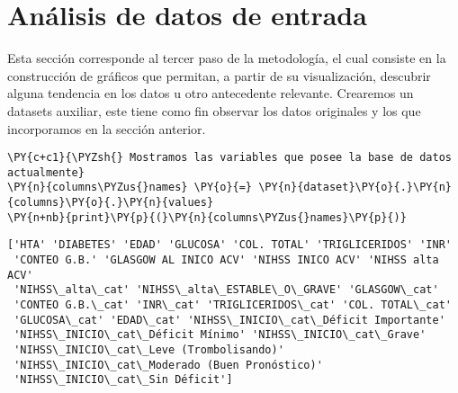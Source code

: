     \hypertarget{anuxe1lisis-de-datos-de-entrada}{%
\section{Análisis de datos de entrada}\label{anuxe1lisis-de-datos-de-entrada}}

Esta sección corresponde al tercer paso de la metodología, el cual consiste en la construcción de gráficos que permitan, a partir de su visualización, descubrir alguna tendencia en los datos u otro antecedente relevante. Crearemos un datasets auxiliar, este tiene como fin observar los datos originales y los que incorporamos en la sección anterior.

    \begin{tcolorbox}[breakable, size=fbox, boxrule=1pt, pad at break*=1mm,colback=cellbackground, colframe=cellborder]
\begin{Verbatim}[commandchars=\\\{\}]
\PY{c+c1}{\PYZsh{} Mostramos las variables que posee la base de datos actualmente}
\PY{n}{columns\PYZus{}names} \PY{o}{=} \PY{n}{dataset}\PY{o}{.}\PY{n}{columns}\PY{o}{.}\PY{n}{values}
\PY{n+nb}{print}\PY{p}{(}\PY{n}{columns\PYZus{}names}\PY{p}{)}
\end{Verbatim}
\end{tcolorbox}

    \begin{Verbatim}[commandchars=\\\{\}]
['HTA' 'DIABETES' 'EDAD' 'GLUCOSA' 'COL. TOTAL' 'TRIGLICERIDOS' 'INR'
 'CONTEO G.B.' 'GLASGOW AL INICO ACV' 'NIHSS INICO ACV' 'NIHSS alta ACV'
 'NIHSS\_alta\_cat' 'NIHSS\_alta\_ESTABLE\_O\_GRAVE' 'GLASGOW\_cat'
 'CONTEO G.B.\_cat' 'INR\_cat' 'TRIGLICERIDOS\_cat' 'COL. TOTAL\_cat'
 'GLUCOSA\_cat' 'EDAD\_cat' 'NIHSS\_INICIO\_cat\_Déficit Importante'
 'NIHSS\_INICIO\_cat\_Déficit Mínimo' 'NIHSS\_INICIO\_cat\_Grave'
 'NIHSS\_INICIO\_cat\_Leve (Trombolisando)'
 'NIHSS\_INICIO\_cat\_Moderado (Buen Pronóstico)'
 'NIHSS\_INICIO\_cat\_Sin Déficit']
    \end{Verbatim}

